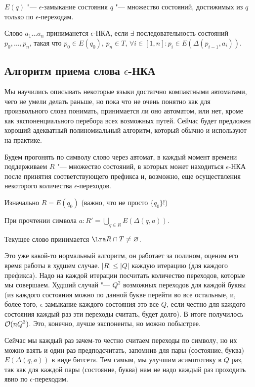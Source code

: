 \begin{Def}
$E(q)$ "--- $\epsilon$-замыкание состояния $q$ "--- множество состояний, достижимых из $q$ только по $\epsilon$-переходам.
\end{Def}


\begin{Def}
Слово $a_1 \dots a_n$ приниманется $\epsilon$-НКА, если $\exists$ последовательность состояний $p_0, \dots, p_n$, такая что
$p_0 \in E(q_0)$, $p_n \in T$, $\forall i \in [1, n]: p_i \in E(\Delta(p_{i-1}, a_i))$.
\end{Def}

\subsection{Алгоритм приема слова \texorpdfstring{$\epsilon$}{epsilon}-НКА}
Мы научились описывать некоторые языки достатчно компактными автоматами, чего не умели делать раньше, но пока что не очень понятно как для произвольного слова понимать, принимается ли оно автоматом, или нет,
кроме как экспоненциального перебора всех возможных путей. Сейчас будет предложен хороший адекватный полиномиальный алгоритм, который обычно и используют на практике.

Будем прогонять по символу слово через автомат, в каждый момент времени поддерживаем $R$ "---  множество состояний, в которых может находиться $\epsilon$-НКА после принятия соответствующего префикса и,
возможно, еще осуществления некоторого количества $\epsilon$-переходов. 

Изначально $R = E(q_0)$ (важно, что не просто $\{q_0\}$!)

При прочтении символа $a\colon R' =  \bigcup\limits_{q \in R} E(\Delta(q, a))$.

Текущее слово принимается $\Lra R \cap T \neq \varnothing$.

Это уже какой-то нормальный алгоритм, он работает за полином, оценим его время работы в худшем случае.
$|R| \leqslant |Q|$ каждую итерацию (для каждого префикса). 
Надо на каждой итерации посчитать количество переходов, которые мы совершаем.
Худший случай "--- $Q^2$ возможных переходов для каждой буквы 
(из каждого состояния можно по данной букве перейти во все остальные, и, более того, $\epsilon$-замыкание каждого состояния это все $Q$, если честно для каждого состояния каждый раз эти переходы считать, будет долго).
В итоге получилось $\mathcal{O}(nQ^3)$. Это, конечно, лучше экспоненты, но можно побыстрее.

Сейчас мы каждый раз зачем-то честно считаем переходы по символу, но их можно взять и один раз предподсчитать, запомнив для пары (состояние, буква) $E(\Delta(q, a))$ в виде битсета. 
Тем самым, мы улучшим асимптотику в $Q$ раз, так как для каждой пары (состояние, буква) нам не надо каждый раз проходить явно по $\epsilon$-переходим.


